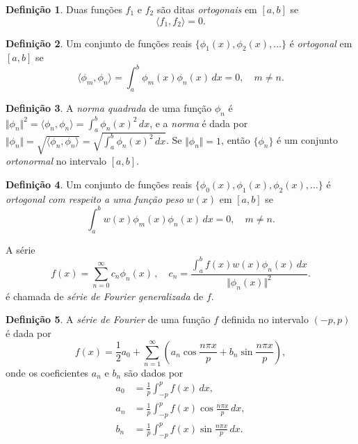 \documentclass[12pt]{article}
\theoremstyle{plain}
\theoremstyle{definition}
\newtheorem{defn}{Definição}[section]
\theoremstyle{remark}
\begin{document}
\begin{defn}
    Duas funções \(f_1\) e \(f_2\) são ditas \emph{ortogonais} em \([a,b]\) se
    \begin{equation}
        \langle f_1, f_2 \rangle = 0.
    \end{equation}
\end{defn}

\begin{defn}
    Um conjunto de funções reais \(\{\phi_1(x), \phi_2(x), \ldots\}\) é \emph{ortogonal} em \([a,b]\) se
    \begin{equation}
        \langle \phi_m, \phi_n \rangle = \int_a^b \phi_m(x)\phi_n(x) \, dx = 0, \quad m \neq n.
    \end{equation}
\end{defn}

\begin{defn}
    A \emph{norma quadrada} de uma função \(\phi_n\) é \(\Vert \phi _n \Vert^2 = \langle \phi_n, \phi_n \rangle = \int_a^b \phi_n(x)^2 \, dx\), e a \emph{norma} é dada por \(\Vert \phi_n \Vert = \sqrt{\langle \phi_n, \phi_n \rangle} = \sqrt{\int_a^b \phi_n(x)^2 \, dx}\). Se \(\Vert \phi_n \Vert = 1\), então \(\{\phi_n\}\) é um conjunto \emph{ortonormal} no intervalo \([a,b]\).
\end{defn}

\begin{defn}
    Um conjunto de funções reais \(\{\phi_0(x), \phi_1(x), \phi_2(x), \ldots\}\) é \emph{ortogonal com respeito a uma função peso} \(w(x)\) em \([a,b]\) se
    \begin{equation}
        \int_{a}^{b} w(x)\phi_m(x)\phi_n(x) \, dx = 0, \quad m \neq n.
    \end{equation}

    \noindent A série 
    \begin{equation}
    f(x)=\sum_{n=0}^{\infty} c_n \phi_n(x)\,, \quad c_n=\frac{\int_{a}^{b} f(x)w(x)\phi_n(x) \, dx}{\Vert \phi_n(x)\Vert^2}.
    \end{equation}
    \noindent é chamada de \emph{série de Fourier generalizada} de \(f\).
\end{defn}

\begin{defn}
    A \emph{série de Fourier} de uma função \(f\) definida no intervalo \((-p,p)\) é dada por
    \begin{equation}
        f(x) = \frac{1}{2}a_0 + \sum_{n=1}^{\infty} \left( a_n \cos\frac{n\pi x}{p} + b_n \sin\frac{n\pi x}{p} \right),
    \end{equation}
    onde os coeficientes \(a_n\) e \(b_n\) são dados por
    \begin{align}
        a_0 &= \frac{1}{p} \int_{-p}^{p} f(x) \, dx, \\
        a_n &= \frac{1}{p} \int_{-p}^{p} f(x) \cos\frac{n\pi x}{p} \, dx, \\
        b_n &= \frac{1}{p} \int_{-p}^{p} f(x) \sin\frac{n\pi x}{p} \, dx.
    \end{align}
\end{defn}
\end{document}
